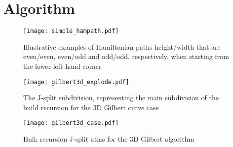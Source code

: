 \section{Algorithm}

\begin{figure}[h]
  \centering
  \texttt{[image: simple\_hampath.pdf]}
  \caption{ Illustrative examples of Hamiltonian paths height/width that are even/even, even/odd and odd/odd, respectively,
            when starting from the lower left hand corner }
  \label{fig:exampleHampath}
\end{figure}


\begin{figure}[h]
  \centering
  \texttt{[image: gilbert3d\_explode.pdf]}
  \caption{ The J-split subdivision, representing the main subdivision of the build recursion for the 3D Gilbert curve case }
  \label{fig:gilbert3DJSplit}
\end{figure}


\begin{figure*}[ht]
  \centering
  \texttt{[image: gilbert3d\_case.pdf]}
  \caption{ Bulk recursion J-split atlas for the 3D Gilbert algorithm }
  \label{fig:gilbert3DCase}
\end{figure*}



